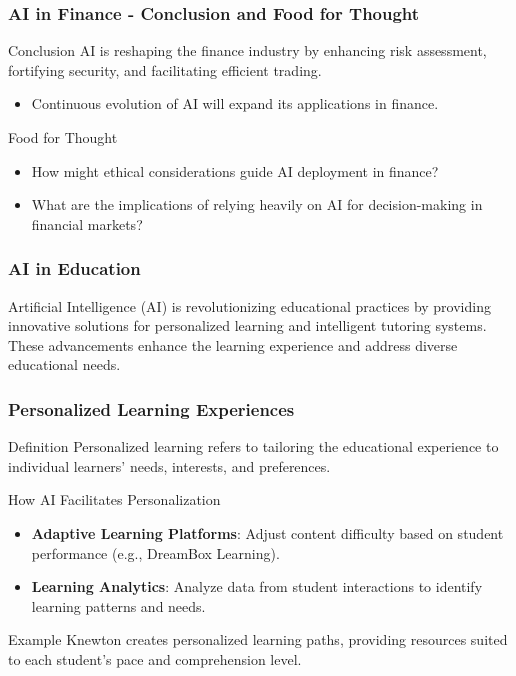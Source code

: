 \documentclass[aspectratio=169]{beamer}
\begin{document}
\begin{frame}[fragile]
    \frametitle{AI in Finance - Conclusion and Food for Thought}
    \begin{block}{Conclusion}
        AI is reshaping the finance industry by enhancing risk assessment, fortifying security, and facilitating efficient trading.
    \end{block}
    \begin{itemize}
        \item Continuous evolution of AI will expand its applications in finance.
    \end{itemize}
    \begin{block}{Food for Thought}
        \begin{itemize}
            \item How might ethical considerations guide AI deployment in finance?
            \item What are the implications of relying heavily on AI for decision-making in financial markets?
        \end{itemize}
    \end{block}
\end{frame}

\begin{frame}[fragile]
    \frametitle{AI in Education}
    Artificial Intelligence (AI) is revolutionizing educational practices by providing innovative solutions for personalized learning and intelligent tutoring systems. These advancements enhance the learning experience and address diverse educational needs.
\end{frame}

\begin{frame}[fragile]
    \frametitle{Personalized Learning Experiences}
    
    \begin{block}{Definition}
        Personalized learning refers to tailoring the educational experience to individual learners’ needs, interests, and preferences.
    \end{block}
    
    \begin{block}{How AI Facilitates Personalization}
        \begin{itemize}
            \item \textbf{Adaptive Learning Platforms}: Adjust content difficulty based on student performance (e.g., DreamBox Learning).
            \item \textbf{Learning Analytics}: Analyze data from student interactions to identify learning patterns and needs.
        \end{itemize}
    \end{block}
    
    \begin{block}{Example}
        Knewton creates personalized learning paths, providing resources suited to each student's pace and comprehension level.
    \end{block}
\end{frame}
\end{document}
